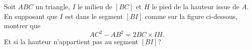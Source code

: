 \begin{exo}
Soit $ABC$ un triangle,  $I$ le milieu de $[BC]$ et $H$ le pied de la hauteur issue de $A$.
En supposant que $I$ est dans le segment $[BI]$ comme sur la figure ci-dessous, montrer que 
\[ AC^2-AB^2 = 2BC\times IH.\]
Et si la hauteur n'appartient pas au segment $[BI]$? 
\begin{center}
\end{center}
\begin{hint}

\end{hint}
\end{exo}






\indications
\correction



